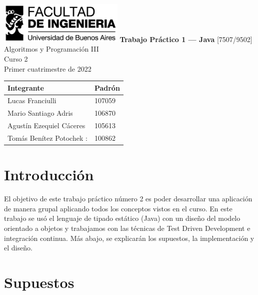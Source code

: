\documentclass[titlepage,a4paper]{article}
\begin{document}
    \begin{titlepage} %
        \hfill\includegraphics[width=6cm]{logofiuba.jpg}
        \centering
        \vfill
        \Huge \textbf{Trabajo Práctico 1 — Java}
        \vskip2cm
        \Large [7507/9502] Algoritmos y Programación III\\
        Curso 2 \\ %
        Primer cuatrimestre de 2022
        \vfill
        \begin{tabular}{ | l | l | } %
            \hline
            Integrante & Padrón \\ \hline
            Lucas Franciulli   & 107059 \\ \hline
            Mario Santiago Adris  & 106870 \\ \hline
            Agustín Ezequiel Cáceres & 105613 \\\hline
            Tomás Benítez Potochek : & 100862\\ \hline
            \hline
        \end{tabular}
        \vfill
        \vfill
    \end{titlepage}

    \tableofcontents %
    \newpage

    \section{Introducción}\label{sec:intro}
    El objetivo de este trabajo práctico número 2 es poder desarrollar una aplicación de manera grupal aplicando todos los conceptos vistos en el curso. En este trabajo se usó el lenguaje de tipado estático (Java) con un diseño del modelo orientado a objetos y trabajamos con las técnicas de Test Driven Development e integración continua. Más abajo, se explicarán
    los supuestos, la implementación y el diseño.

    \section{Supuestos}\label{sec:supuestos}
\end{document}

